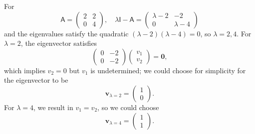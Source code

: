 \documentclass[letter-paper]{tufte-book}
\newenvironment{example}[1][Example]{\begin{trivlist}
\item[\hskip \labelsep {\bfseries #1}]}{\end{trivlist}}
\newcommand{\As}{{\mathsf{A}}}
\newcommand{\Is}{{\mathsf{I}}}
\newcommand{\Ob}{{\boldsymbol{0}}}
\newcommand{\vb}{{\boldsymbol{v}}}
\begin{document}
\begin{example}
  For
  \begin{equation*}
    \As = \begin{pmatrix}2 & 2 \\ 0 & 4\end{pmatrix}, \quad \lambda\Is - \As = \begin{pmatrix}\lambda - 2 & -2 \\ 0 & \lambda - 4\end{pmatrix}
  \end{equation*}
  and the eigenvalues satisfy the quadratic
  $(\lambda-2)(\lambda-4) = 0$, so $\lambda=2, 4$. For $\lambda=2$, the
  eigenvector satisfies
  \begin{equation*}
    \begin{pmatrix}0 & -2 \\ 0 & -2\end{pmatrix}\begin{pmatrix}v_1 \\ v_2 \end{pmatrix} = \Ob,
  \end{equation*}
  which implies $v_2 = 0$ but $v_1$ is undetermined; we could choose for
  simplicity for the eigenvector to be
  \begin{equation*}
   \vb_{\lambda=2} = \begin{pmatrix}1 \\ 0 \end{pmatrix}.
  \end{equation*}
  For $\lambda = 4$, we result in $v_1 = v_2$, so we could choose
  \begin{equation*}
   \vb_{\lambda=4} = \begin{pmatrix}1 \\ 1 \end{pmatrix}.
  \end{equation*}
\end{example}
\end{document}
